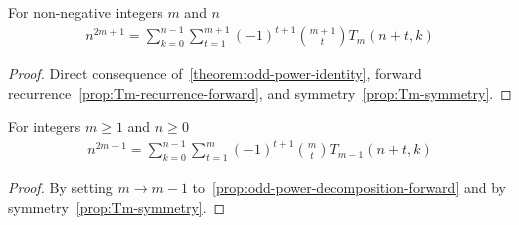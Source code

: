 \begin{proposition}
    \label{prop:odd-power-decomposition-forward-shifted}
    For non-negative integers $m$ and $n$
    \begin{align*}
        n^{2m+1} = \sum_{k=0}^{n-1} \sum_{t=1}^{m+1} (-1)^{t+1} \binom{m+1}{t} T_{m} (n+t, k)
    \end{align*}
    \begin{proof}
        Direct consequence of~\eqref{theorem:odd-power-identity},
        forward recurrence~\eqref{prop:Tm-recurrence-forward}, and symmetry~\eqref{prop:Tm-symmetry}.
    \end{proof}
\end{proposition}

\begin{proposition}
    \label{prop:odd-power-decomposition-forward-m-1-shifted}
    For integers $m \geq 1$ and $n \geq 0$
    \begin{align*}
        n^{2m-1} = \sum_{k=0}^{n-1} \sum_{t=1}^{m} (-1)^{t+1} \binom{m}{t} T_{m-1} (n+t, k)
    \end{align*}
    \begin{proof}
        By setting $m \rightarrow m-1$ to~\eqref{prop:odd-power-decomposition-forward} and
        by symmetry~\eqref{prop:Tm-symmetry}.
    \end{proof}
\end{proposition}
